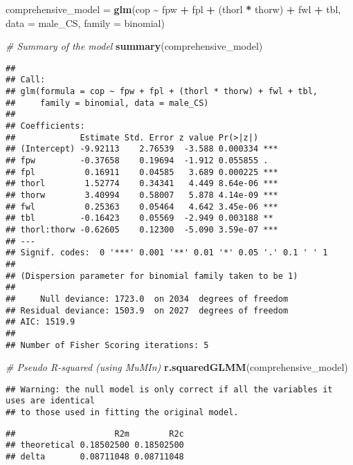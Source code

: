 \documentclass[
]{article}
\newenvironment{Shaded}{\begin{snugshade}}{\end{snugshade}}
\newcommand{\AttributeTok}[1]{\textcolor[rgb]{0.13,0.29,0.53}{#1}}
\newcommand{\CommentTok}[1]{\textcolor[rgb]{0.56,0.35,0.01}{\textit{#1}}}
\newcommand{\FunctionTok}[1]{\textcolor[rgb]{0.13,0.29,0.53}{\textbf{#1}}}
\newcommand{\NormalTok}[1]{#1}
\newcommand{\OtherTok}[1]{\textcolor[rgb]{0.56,0.35,0.01}{#1}}
\newcommand{\SpecialCharTok}[1]{\textcolor[rgb]{0.81,0.36,0.00}{\textbf{#1}}}
\begin{document}
\begin{Shaded}
\begin{Highlighting}[]
\NormalTok{comprehensive\_model }\OtherTok{=} \FunctionTok{glm}\NormalTok{(cop }\SpecialCharTok{\textasciitilde{}}\NormalTok{ fpw }\SpecialCharTok{+}\NormalTok{ fpl }\SpecialCharTok{+}\NormalTok{ (thorl }\SpecialCharTok{*}\NormalTok{ thorw) }\SpecialCharTok{+}\NormalTok{ fwl }\SpecialCharTok{+}\NormalTok{ tbl, }
                           \AttributeTok{data =}\NormalTok{ male\_CS, }\AttributeTok{family =}\NormalTok{ binomial)}

\CommentTok{\# Summary of the model}
\FunctionTok{summary}\NormalTok{(comprehensive\_model)}
\end{Highlighting}
\end{Shaded}

\begin{verbatim}
## 
## Call:
## glm(formula = cop ~ fpw + fpl + (thorl * thorw) + fwl + tbl, 
##     family = binomial, data = male_CS)
## 
## Coefficients:
##             Estimate Std. Error z value Pr(>|z|)    
## (Intercept) -9.92113    2.76539  -3.588 0.000334 ***
## fpw         -0.37658    0.19694  -1.912 0.055855 .  
## fpl          0.16911    0.04585   3.689 0.000225 ***
## thorl        1.52774    0.34341   4.449 8.64e-06 ***
## thorw        3.40994    0.58007   5.878 4.14e-09 ***
## fwl          0.25363    0.05464   4.642 3.45e-06 ***
## tbl         -0.16423    0.05569  -2.949 0.003188 ** 
## thorl:thorw -0.62605    0.12300  -5.090 3.59e-07 ***
## ---
## Signif. codes:  0 '***' 0.001 '**' 0.01 '*' 0.05 '.' 0.1 ' ' 1
## 
## (Dispersion parameter for binomial family taken to be 1)
## 
##     Null deviance: 1723.0  on 2034  degrees of freedom
## Residual deviance: 1503.9  on 2027  degrees of freedom
## AIC: 1519.9
## 
## Number of Fisher Scoring iterations: 5
\end{verbatim}

\begin{Shaded}
\begin{Highlighting}[]
\CommentTok{\# Pseudo R{-}squared (using MuMIn)}
\FunctionTok{r.squaredGLMM}\NormalTok{(comprehensive\_model)}
\end{Highlighting}
\end{Shaded}

\begin{verbatim}
## Warning: the null model is only correct if all the variables it uses are identical 
## to those used in fitting the original model.
\end{verbatim}

\begin{verbatim}
##                    R2m        R2c
## theoretical 0.18502500 0.18502500
## delta       0.08711048 0.08711048
\end{verbatim}
\end{document}
